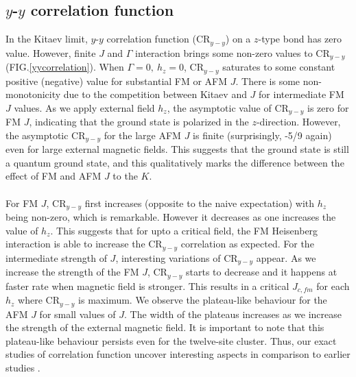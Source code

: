 \documentclass[aps,amsmath,twocolumn,amssymb,floatfix,showpacs,superscriptaddress,nofootinbib,longbibliography]{revtex4-1}
\begin{document}
\subsection{$y$-$y$ correlation function} In the Kitaev limit, $y$-$y$ correlation function (CR$_{y-y}$) on a $z$-type bond has zero value. However, finite $J$ and $\Gamma$ interaction brings some non-zero values to CR$_{y-y}$ (FIG.\ref{yycorrelation}). When $\Gamma=0,~h_z=0$, CR$_{y-y}$ saturates to some constant positive (negative) value for substantial FM or AFM $J$.
There is some non-monotonicity due to the competition between Kitaev and $J$ for intermediate FM $J$ values. As we apply external field $h_z$, the asymptotic value of CR$_{y-y}$ is zero for FM $J$, indicating that the ground state is polarized in the $z$-direction. However, the asymptotic CR$_{y-y}$ for the large AFM $J$ is finite (surprisingly, -5/9 again) even for large external magnetic fields. This suggests that the ground state is still a quantum ground state, and this qualitatively marks the difference between the effect of FM and AFM $J$ to the $K$.
\\\\\indent
 For FM $J$, CR$_{y-y}$ first increases (opposite to the naive expectation) with $h_z$ being non-zero, which is remarkable. However it decreases as one increases the value of $h_z$. This suggests that for upto a critical field, the FM Heisenberg interaction is able to increase the CR$_{y-y}$ correlation as expected. For the intermediate strength of $J$, interesting variations of CR$_{y-y}$ appear.  As we increase the strength of the FM $J$, CR$_{y-y}$ starts to decrease and it happens at faster rate when magnetic field is stronger. This results in a critical $J_{c,fm}$ for each $h_z$ where CR$_{y-y}$ is maximum. We observe the plateau-like behaviour for the AFM $J$ for small values of $J$. The width of the plateaus increases as we increase the strength of the external magnetic field. It is important to note that this plateau-like behaviour persists even for the twelve-site cluster. Thus, our exact studies of correlation function uncover interesting aspects in comparison to earlier studies \cite{tikhonov-2011,song-2016,lunkin-2019,yang-2020,berke-prb-2020}.
\end{document}
